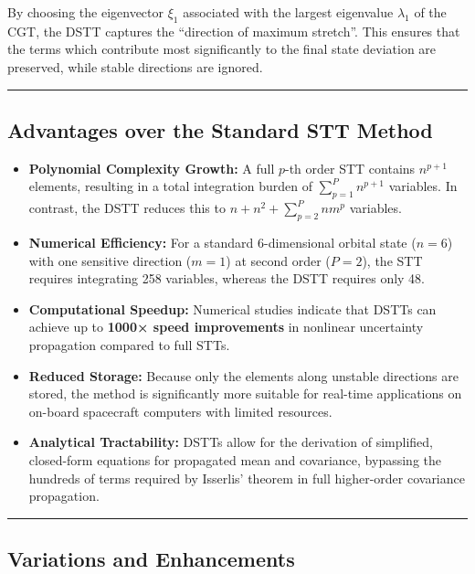 \documentclass[
  letterpaper,
  DIV=11,
  numbers=noendperiod,
  oneside]{scrartcl}
\begin{document}
By choosing the eigenvector \(\xi_1\) associated with the largest
eigenvalue \(\lambda_1\) of the CGT, the DSTT captures the ``direction
of maximum stretch''. This ensures that the terms which contribute most
significantly to the final state deviation are preserved, while stable
directions are ignored.

\begin{center}\rule{0.5\linewidth}{0.5pt}\end{center}

\subsection{Advantages over the Standard STT
Method}\label{advantages-over-the-standard-stt-method}

\begin{itemize}
\item
  \textbf{Polynomial Complexity Growth:} A full \(p\)-th order STT
  contains \(n^{p+1}\) elements, resulting in a total integration burden
  of \(\sum_{p=1}^P n^{p+1}\) variables. In contrast, the DSTT reduces
  this to \(n + n^2 + \sum_{p=2}^P n m^p\) variables.
\item
  \textbf{Numerical Efficiency:} For a standard 6-dimensional orbital
  state (\(n=6\)) with one sensitive direction (\(m=1\)) at second order
  (\(P=2\)), the STT requires integrating 258 variables, whereas the
  DSTT requires only 48.
\item
  \textbf{Computational Speedup:} Numerical studies indicate that DSTTs
  can achieve up to \textbf{1000× speed improvements} in nonlinear
  uncertainty propagation compared to full STTs.
\item
  \textbf{Reduced Storage:} Because only the elements along unstable
  directions are stored, the method is significantly more suitable for
  real-time applications on on-board spacecraft computers with limited
  resources.
\item
  \textbf{Analytical Tractability:} DSTTs allow for the derivation of
  simplified, closed-form equations for propagated mean and covariance,
  bypassing the hundreds of terms required by Isserlis' theorem in full
  higher-order covariance propagation.
\end{itemize}

\begin{center}\rule{0.5\linewidth}{0.5pt}\end{center}

\subsection{Variations and
Enhancements}\label{variations-and-enhancements}
\end{document}
